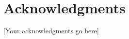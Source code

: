 
\chapter*{Acknowledgments}
\thispagestyle{empty}

%
%
%
%
%
%

\vspace{0.5cm}

[Your acknowledgments go here]
